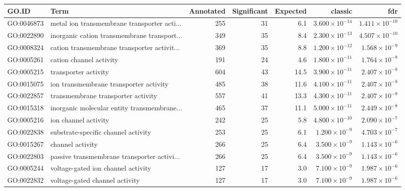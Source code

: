 \begin{table}[ht]
\centering
\begin{tabular}{llrrrrr}
  \hline
GO.ID & Term & Annotated & Significant & Expected & classic & fdr \\ 
  \hline
GO:0046873 & metal ion transmembrane transporter acti... & 255 & 31 & 6.1 & $3.600 \times 10^{-14}$ & $1.411 \times 10^{-10}$ \\ 
  GO:0022890 & inorganic cation transmembrane transport... & 349 & 35 & 8.4 & $2.300 \times 10^{-13}$ & $4.507 \times 10^{-10}$ \\ 
  GO:0008324 & cation transmembrane transporter activit... & 369 & 35 & 8.8 & $1.200 \times 10^{-12}$ & $1.568 \times 10^{-9}$ \\ 
  GO:0005261 & cation channel activity & 191 & 24 & 4.6 & $1.800 \times 10^{-11}$ & $1.764 \times 10^{-8}$ \\ 
  GO:0005215 & transporter activity & 604 & 43 & 14.5 & $3.900 \times 10^{-11}$ & $2.407 \times 10^{-8}$ \\ 
  GO:0015075 & ion transmembrane transporter activity & 485 & 38 & 11.6 & $4.100 \times 10^{-11}$ & $2.407 \times 10^{-8}$ \\ 
  GO:0022857 & transmembrane transporter activity & 557 & 41 & 13.3 & $4.300 \times 10^{-11}$ & $2.407 \times 10^{-8}$ \\ 
  GO:0015318 & inorganic molecular entity transmembrane... & 465 & 37 & 11.1 & $5.000 \times 10^{-11}$ & $2.449 \times 10^{-8}$ \\ 
  GO:0005216 & ion channel activity & 242 & 25 & 5.8 & $4.800 \times 10^{-10}$ & $2.090 \times 10^{-7}$ \\ 
  GO:0022838 & substrate-specific channel activity & 253 & 25 & 6.1 & $1.200 \times 10^{-9}$ & $4.703 \times 10^{-7}$ \\ 
  GO:0015267 & channel activity & 266 & 25 & 6.4 & $3.500 \times 10^{-9}$ & $1.143 \times 10^{-6}$ \\ 
  GO:0022803 & passive transmembrane transporter activi... & 266 & 25 & 6.4 & $3.500 \times 10^{-9}$ & $1.143 \times 10^{-6}$ \\ 
  GO:0005244 & voltage-gated ion channel activity & 127 & 17 & 3.0 & $7.100 \times 10^{-9}$ & $1.987 \times 10^{-6}$ \\ 
  GO:0022832 & voltage-gated channel activity & 127 & 17 & 3.0 & $7.100 \times 10^{-9}$ & $1.987 \times 10^{-6}$ \\ 

\end{tabular}
\end{table}
